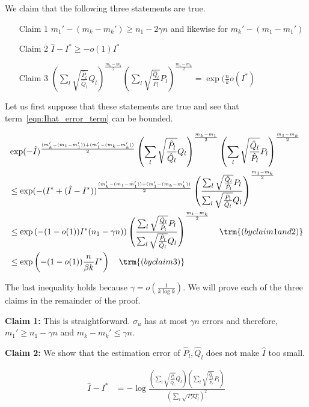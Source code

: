 \documentclass{article}
\begin{document}
We claim that the following three statements are true. 
\begin{enumerate}
\item[Claim 1] $m_1' - (m_k - m_k') \geq n_1 - 2 \gamma n$ and likewise for $m_k' - (m_1 - m_1')$
\item[Claim 2] $\hat{I} - I^* \geq - o(1) I^*$
\item[Claim 3] $\left( \sum_l \sqrt{\frac{\hat{P}_l}{\hat{Q}_l}} Q_l \right)^{\frac{m_k - m_1}{2}} 
 \left( \sum_l \sqrt{\frac{\hat{Q}_l}{\hat{P}_l}} P_l \right)^{\frac{m_1 - m_k}{2}} = \exp(\frac{n}{k}  o(I^*)  $
\end{enumerate}

Let us first suppose that these statements are true and see that term~\ref{eqn:Ihat_error_term} can be bounded. 


\begin{align*}
& \exp( - \hat{I} )^{\frac{(m'_k - (m_1 - m_1')) + (m_1' - (m_k - m_k'))}{2}}  \left( \sum_l \sqrt{\frac{\hat{P}_l}{\hat{Q}_l}} Q_l \right)^{\frac{m_k - m_1}{2}} 
 \left( \sum_l \sqrt{\frac{\hat{Q}_l}{\hat{P}_l}} P_l \right)^{\frac{m_1 - m_k}{2}}  \\
&\leq  \exp( - (I^* + (\hat{I} - I^*) )^{\frac{(m'_k - (m_1 - m_1')) + (m_1' - (m_k - m_k'))}{2}}  
 \left( \frac{\sum_l \sqrt{\frac{\hat{Q}_l}{\hat{P}_l}} P_l}
             {\sum_l \sqrt{\frac{\hat{P}_l}{\hat{Q}_l}} Q_l} \right)^{\frac{m_1 - m_k}{2}}  
  \\
&\leq \exp \left( - (1-o(1)) I^* (n_1 - \gamma n) \right) 
   \left( \frac{\sum_l \sqrt{\frac{\hat{Q}_l}{\hat{P}_l}} P_l}
             {\sum_l \sqrt{\frac{\hat{P}_l}{\hat{Q}_l}} Q_l} \right)^{\frac{m_1 - m_k}{2}}  
   \quad \trm{(by claim 1 and 2)}\\
&\leq \exp \left( - (1-o(1)) \frac{n}{\beta k} I^*  \right) 
   \quad \trm{(by claim 3)}
\end{align*}

The last inequality holds because $\gamma = o\left( \frac{1}{k \log k} \right)$. We will prove each of the three claims in the remainder of the proof.

\textbf{Claim 1:} This is straightforward. $\sigma_u$ has at most $\gamma n$ errors and therefore, $m_1' \geq n_1 - \gamma n$ and $m_k - m_k' \leq \gamma n$. 

\textbf{Claim 2:} We show that the estimation error of $\hat{P}_l, \hat{Q}_l$ does not make $\hat{I}$ too small.

\begin{align}
\hat{I} - I^* &= - \log \frac{ 
     \left( \sum_l \sqrt{\frac{\hat{P}_l}{\hat{Q}_l}} Q_l \right)
     \left( \sum_l \sqrt{\frac{\hat{Q}_l}{\hat{P}_l}} P_l \right)}{ 
          \left( \sum_l \sqrt{P_l Q_l} \right)^2 } \label{eqn:Ihat_Istar}
\end{align}
\end{document}
